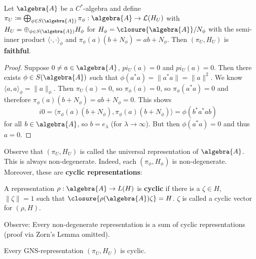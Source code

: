 \documentclass[a4paper]{article}
\begin{document}
\begin{theorem}
	Let $\algebra{A}$ be a $C^*$-algebra and define $\pi_U \coloneq \bigoplus_{\phi \in S(\algebra{A})} \pi_\phi: \algebra{A} \to \mathcal{L}(H_U)$ with $H_U = \oplus_{\phi \in S(\algebra{A})} H_\phi$ for $H_\phi = \closure{\algebra{A}}/N_\phi$ with the semi-inner product $\langle \cdot, \cdot \rangle_\phi$ and $\pi_\phi(a)(b + N_\phi) = ab + N_\phi$.
	Then $(\pi_U, H_U)$ is \textbf{faithful}.
\end{theorem}

\begin{proof}
	Suppose $0 \neq a \in \algebra{A}$, $pi_U(a) = 0$ and $pi_U(a) = 0$.
	Then there exists $\phi \in S(\algebra{A})$ such that $\phi(a^* a) = \|a^* 
	a\| = \|a\|^2$.
	We know $\langle a, a \rangle_\phi = \|a\|_\phi$.
	Then $\pi_U(a) = 0$, so $\pi_\phi(a) = 0$, so $\pi_\phi(a^*a) = 0$ and therefore $\pi_\phi(a)(b + N_\phi) = ab + N_\phi = 0$.
	This shows 
	\begin{equation*}
	i	0 = \langle \pi_\phi(a) (b + N_\phi), \pi_\phi(a)(b + N_\phi) \rangle = \phi(b^* a^* a b)
	\end{equation*}
	for all $b \in \algebra{A}$, so $b = e_\lambda$ (for $\lambda \to \infty$).
	But then $\phi(a^* a) = 0$ and thus $a = 0$.
\end{proof}

Observe that $(\pi_U, H_U)$ is called the universal representation of $\algebra{A}$.
This is always non-degenerate.
Indeed, each $(\pi_\phi, H_\phi)$  is non-degenerate.
Moreover, these are \textbf{cyclic representations}:

\begin{definition}
	A representation $\rho: \algebra{A} \to L(H)$ is \textbf{cyclic} if there is a $\zeta \in H$, $\|\zeta\| = 1$ such that $\closure{\rho(\algebra{A}) \zeta} = H$.
	$\zeta$ is called a cyclic vector for $(\rho, H)$.
\end{definition}

Observe: Every non-degenerate representation is a sum of cyclic representations (proof via Zorn's Lemma omitted).

\begin{proposition}
	Every GNS-representation $(\pi_U, H_U)$ is cyclic.
\end{proposition}
\end{document}
